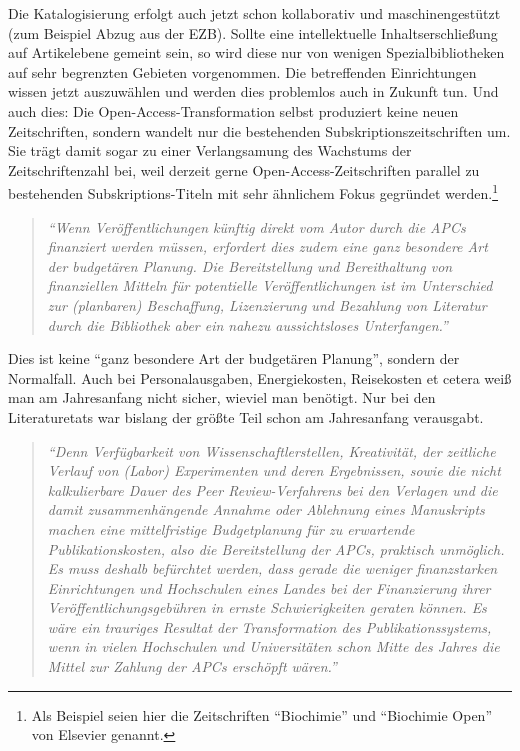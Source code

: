 \documentclass[a4paper,
fontsize=11pt,
oneside,
numbers=noperiodatend,
parskip=half-,
bibliography=totoc,
final
]{scrartcl}
\begin{document}
Die Katalogisierung erfolgt auch jetzt schon kollaborativ und
maschinengestützt (zum Beispiel Abzug aus der EZB). Sollte eine
intellektuelle Inhaltserschließung auf Artikelebene gemeint sein, so
wird diese nur von wenigen Spezialbibliotheken auf sehr begrenzten
Gebieten vorgenommen. Die betreffenden Einrichtungen wissen jetzt
auszuwählen und werden dies problemlos auch in Zukunft tun. Und auch
dies: Die Open-Access-Transformation selbst produziert keine neuen
Zeitschriften, sondern wandelt nur die bestehenden
Subskriptionszeitschriften um. Sie trägt damit sogar zu einer
Verlangsamung des Wachstums der Zeitschriftenzahl bei, weil derzeit
gerne Open-Access-Zeitschriften parallel zu bestehenden
Subskriptions-Titeln mit sehr ähnlichem Fokus gegründet
werden.\footnote{Als Beispiel seien hier die Zeitschriften
  \enquote{Biochimie} und \enquote{Biochimie Open} von Elsevier genannt.}

\begin{quote}
\emph{\enquote{Wenn Veröffentlichungen künftig direkt vom Autor durch
die APCs finanziert werden müssen, erfordert dies zudem eine ganz
besondere Art der budgetären Planung. Die Bereitstellung und
Bereithaltung von finanziellen Mitteln für potentielle
Veröffentlichungen ist im Unterschied zur (planbaren) Beschaffung,
Lizenzierung und Bezahlung von Literatur durch die Bibliothek aber ein
nahezu aussichtsloses Unterfangen.}}
\end{quote}

Dies ist keine \enquote{ganz besondere Art der budgetären Planung},
sondern der Normalfall. Auch bei Personalausgaben, Energiekosten,
Reisekosten et cetera weiß man am Jahresanfang nicht sicher, wieviel man
benötigt. Nur bei den Literaturetats war bislang der größte Teil schon
am Jahresanfang verausgabt.

\begin{quote}
\emph{\enquote{Denn Verfügbarkeit von Wissenschaftlerstellen,
Kreativität, der zeitliche Verlauf von (Labor) Experimenten und deren
Ergebnissen, sowie die nicht kalkulierbare Dauer des Peer
Review-Verfahrens bei den Verlagen und die damit zusammenhängende
Annahme oder Ablehnung eines Manuskripts machen eine mittelfristige
Budgetplanung für zu erwartende Publikationskosten, also die
Bereitstellung der APCs, praktisch unmöglich. Es muss deshalb befürchtet
werden, dass gerade die weniger finanzstarken Einrichtungen und
Hochschulen eines Landes bei der Finanzierung ihrer
Veröffentlichungsgebühren in ernste Schwierigkeiten geraten können. Es
wäre ein trauriges Resultat der Transformation des Publikationssystems,
wenn in vielen Hochschulen und Universitäten schon Mitte des Jahres die
Mittel zur Zahlung der APCs erschöpft wären.}}
\end{quote}
\end{document}
